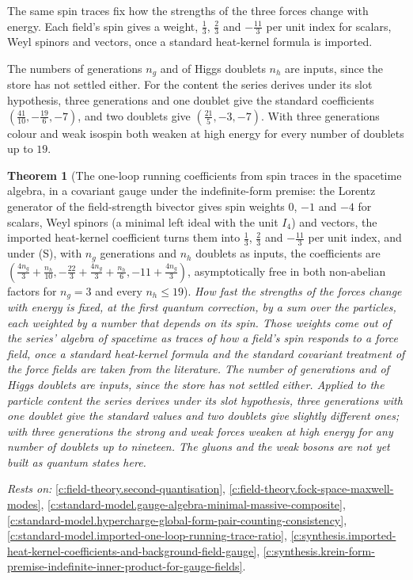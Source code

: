 \documentclass[11pt]{article}
\newtheorem{theorem}{Theorem}[section]
\theoremstyle{definition}
\theoremstyle{plain}
\begin{document}
The same spin traces fix how the strengths of the three forces change with energy. Each field's spin gives a weight, $\tfrac13$, $\tfrac23$ and $-\tfrac{11}{3}$ per unit index for scalars, Weyl spinors and vectors, once a standard heat-kernel formula is imported.

The numbers of generations $n_{g}$ and of Higgs doublets $n_{h}$ are inputs, since the store has not settled either. For the content the series derives under its slot hypothesis, three generations and one doublet give the standard coefficients $(\tfrac{41}{10}, -\tfrac{19}{6}, -7)$, and two doublets give $(\tfrac{21}{5}, -3, -7)$. With three generations colour and weak isospin both weaken at high energy for every number of doublets up to $19$.

\begin{theorem}[The one-loop running coefficients from spin traces in the spacetime algebra, in a covariant gauge under the indefinite-form premise: the Lorentz generator of the field-strength bivector gives spin weights $0$, $-1$ and $-4$ for scalars, Weyl spinors (a minimal left ideal with the unit $I_{4}$) and vectors, the imported heat-kernel coefficient turns them into $\tfrac13$, $\tfrac23$ and $-\tfrac{11}{3}$ per unit index, and under (S), with $n_{g}$ generations and $n_{h}$ doublets as inputs, the coefficients are $(\tfrac{4n_{g}}{3} + \tfrac{n_{h}}{10}, -\tfrac{22}{3} + \tfrac{4n_{g}}{3} + \tfrac{n_{h}}{6}, -11 + \tfrac{4n_{g}}{3})$, asymptotically free in both non-abelian factors for $n_{g} = 3$ and every $n_{h} \leq 19$]\label{c:synthesis.one-loop-running-coefficients-from-spacetime-algebra-spin-traces}
How fast the strengths of the forces change with energy is fixed, at the first quantum correction, by a sum over the particles, each weighted by a number that depends on its spin. Those weights come out of the series' algebra of spacetime as traces of how a field's spin responds to a force field, once a standard heat-kernel formula and the standard covariant treatment of the force fields are taken from the literature. The number of generations and of Higgs doublets are inputs, since the store has not settled either. Applied to the particle content the series derives under its slot hypothesis, three generations with one doublet give the standard values and two doublets give slightly different ones; with three generations the strong and weak forces weaken at high energy for any number of doublets up to nineteen. The gluons and the weak bosons are not yet built as quantum states here.
\end{theorem}
\noindent\emph{Rests on:} \ref{c:field-theory.second-quantisation}, \ref{c:field-theory.fock-space-maxwell-modes}, \ref{c:standard-model.gauge-algebra-minimal-massive-composite}, \ref{c:standard-model.hypercharge-global-form-pair-counting-consistency}, \ref{c:standard-model.imported-one-loop-running-trace-ratio}, \ref{c:synthesis.imported-heat-kernel-coefficients-and-background-field-gauge}, \ref{c:synthesis.krein-form-premise-indefinite-inner-product-for-gauge-fields}.
\end{document}
